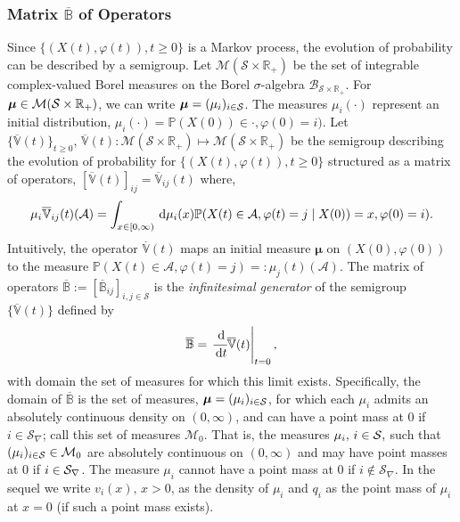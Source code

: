 \subsubsection{Matrix $\overline{\mathbb B}$ of Operators}
\label{subsec:B_operators}
Since \(\{(X(t),\varphi(t)),t\geq 0\}\) is a Markov process, the evolution of probability can be described by a semigroup. Let $\mathcal{M}(\mathcal{S} \times \mathbb{R}_{+})$ be the set of integrable complex-valued Borel measures on the Borel $\sigma$-algebra $\mathcal{B}_{\mathcal{S} \times \mathbb{R}_{+}}$. For $\boldsymbol{\mu} \in \mathcal{M}(\mathcal{S} \times \mathbb{R}_{+})$, we can write \(\boldsymbol{\mu} = (\mu_i)_{i \in \mathcal{S}}\). The measures \(\mu_i(\cdot)\) represent an initial distribution, \(\mu_i(\cdot) = \mathbb P(X(0))\in\cdot, \varphi(0) = i)\). 
Let \(\{\overline{\mathbb V}(t)\}_{t\geq 0},\, \overline{\mathbb V}(t):\mathcal{M}(\mathcal{S} \times \mathbb{R}_{+})\mapsto \mathcal{M}(\mathcal{S} \times \mathbb{R}_{+})\) be the semigroup describing the evolution of probability for \(\{(X(t),\varphi(t)),t\geq 0\}\) structured as a matrix of operators, \(\left[ \overline{\mathbb V}(t)\right]_{ij}= \overline{\mathbb V}_{ij}(t)\) where, 
\[\mu_i \overline{ \mathbb V}_{ij}(t)(\mathcal A) = \int_{x\in[0,\infty)} \, \mathrm{d} \mu_i(x)\mathbb P (X(t) \in\mathcal A,\varphi(t) = j \mid X(0)) = x, \varphi(0) = i).\]
Intuitively, the operator \( \overline{\mathbb V}(t)\) maps an initial measure \(\boldsymbol \mu\) on \((X(0),\varphi(0))\) to the measure \(\mathbb P(X(t)\in \mathcal A, \varphi(t)=j)=:\mu_j(t)(\mathcal A)\). 
The matrix of operators \( \overline{\mathbb B}:=[\overline{\mathbb B}_{ij}]_{i,j\in\mathcal S}\) is the \textit{infinitesimal generator} of the semigroup \(\{ \overline{\mathbb V}(t)\}\) defined by 
\[ \overline{\mathbb B} =\left.\cfrac{\, \mathrm{d}}{\, \mathrm{d} t} \overline{\mathbb V}(t)\right|_{t=0},\]
with domain the set of measures for which this limit exists. Specifically, the domain of \(\overline{\mathbb B}\) is the set of measures, \(\boldsymbol \mu = (\mu_i)_{i\in\mathcal{S}}\), for which each \(\mu_i\) admits an absolutely continuous density on \((0,\infty)\), and can have a point mass at \(0\) if \(i\in\mathcal S_\nabla\); call this set of measures \(\mathcal M_0\). That is, the measures \(\mu_i,\, i\in\mathcal{S},\) such that \((\mu_i)_{i\in\mathcal{S}}\in \mathcal M_0\) are absolutely continuous on \((0,\infty)\) and may have point masses at \(0\) if \(i\in\mathcal{S}_\nabla\). The measure \(\mu_i\) cannot have a point mass at 0 if \(i\notin \mathcal S_\nabla\). In the sequel we write \(v_i(x),\, x>0\), as the density of \(\mu_i\) and \(q_i\) as the point mass of \(\mu_i\) at \(x=0\) (if such a point mass exists). 

